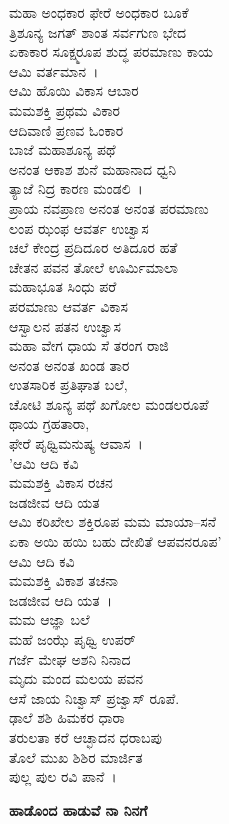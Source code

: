  ಮಹಾ ಅಂಧಕಾರ ಫೇರೆ ಅಂಧಕಾರ ಬೂಕೆ\\ತ್ರಿಶೂನ್ಯ ಜಗತ್ ಶಾಂತ ಸರ್ವಗುಣ ಭೇದ\\ಏಕಾಕಾರ ಸೂಕ್ಷ್ಮರೂಪ ಶುದ್ಧ ಪರಮಾಣು ಕಾಯ\\ಆಮಿ ವರ್ತಮಾನ~।\\ಆಮಿ ಹೊಯಿ ವಿಕಾಸ ಆಬಾರ\\ಮಮಶಕ್ತಿ ಪ್ರಥಮ ವಿಕಾರ\\ಆದಿವಾಣಿ ಪ್ರಣವ ಓಂಕಾರ\\ಬಾಜೆ ಮಹಾಶೂನ್ಯ ಪಥೆ\\ಅನಂತ ಆಕಾಶ ಶುನೆ ಮಹಾನಾದ ಧ್ವನಿ\\ತ್ಯಾಜೆ ನಿದ್ರ ಕಾರಣ ಮಂಡಲಿ~।\\ಪ್ರಾಯ ನವಪ್ರಾಣ ಅನಂತ ಅನಂತ ಪರಮಾಣು\\ಲಂಪ ಝಂಫ ಆವರ್ತ ಉಚ್ವಾಸ\\ಚಲೆ ಕೇಂದ್ರ ಪ್ರದಿದೂರ ಅತಿದೂರ ಹತೆ\\ಚೇತನ ಪವನ ತೋಲೆ ಊರ್ಮಿಮಾಲಾ\\ಮಹಾಭೂತ ಸಿಂಧು ಪರೆ\\ಪರಮಾಣು ಆವರ್ತ ವಿಕಾಸ\\ಆಸ್ವಾಲನ ಪತನ ಉಚ್ವಾಸ\\ಮಹಾ ವೇಗ ಧಾಯ ಸೆ ತರಂಗ ರಾಜಿ\\ಅನಂತ ಅನಂತ ಖಂಡ ತಾರ\\ಉತಸಾರಿಕ ಪ್ರತಿಘಾತ ಬಲೆ,\\ಚೋಟಿ ಶೂನ್ಯ ಪಥೆ ಖಗೋಲ ಮಂಡಲರೂಪೆ\\ಥಾಯ ಗ್ರಹತಾರಾ,\\ಫೇರೆ ಪೃಥ್ವಿಮನುಷ್ಯ ಆವಾಸ~।\\'ಆಮಿ ಆದಿ ಕವಿ\\ಮಮಶಕ್ತಿ ವಿಕಾಸ ರಚನ\\ಜಡಜೀವ ಆದಿ ಯತ\\ಆಮಿ ಕರಿಖೇಲ ಶಕ್ತಿರೂಪ ಮಮ ಮಾಯಾ–ಸನೆ\\ಏಕಾ ಅಯಿ ಹಯಿ ಬಹು ದೇಖಿತೆ ಆಪವನರೂಪ'\\ಆಮಿ ಆದಿ ಕವಿ\\ಮಮಶಕ್ತಿ ವಿಕಾಶ ತಚನಾ\\ಜಡಜೀವ ಆದಿ ಯತ~।\\ಮಮ ಆಜ್ಞಾ ಬಲೆ\\ಮಹೆ ಜಂಝೆ ಪೃಥ್ವಿ ಉಪರ್\\ಗರ್ಜೆ ಮೇಘ ಅಶನಿ ನಿನಾದ\\ಮೃದು ಮಂದ ಮಲಯ ಪವನ\\ಆಸೆ ಜಾಯ ನಿಚ್ವಾಸ್ ಪ್ರಜ್ವಾಸ್ ರೂಪೆ.\\ಢಾಲೆ ಶಶಿ ಹಿಮಕರ ಧಾರಾ\\ತರುಲತಾ ಕರೆ ಆಚ್ಛಾದನ ಧರಾಬಪು\\ತೊಲೆ ಮುಖ ಶಿಶಿರ ಮಾರ್ಜಿತ\\ಪುಲ್ಲ ಪುಲ ರವಿ ಪಾನೆ~।

\begin{center}
\textbf{ಹಾಡೊಂದ ಹಾಡುವೆ ನಾ ನಿನಗೆ}
\end{center}

